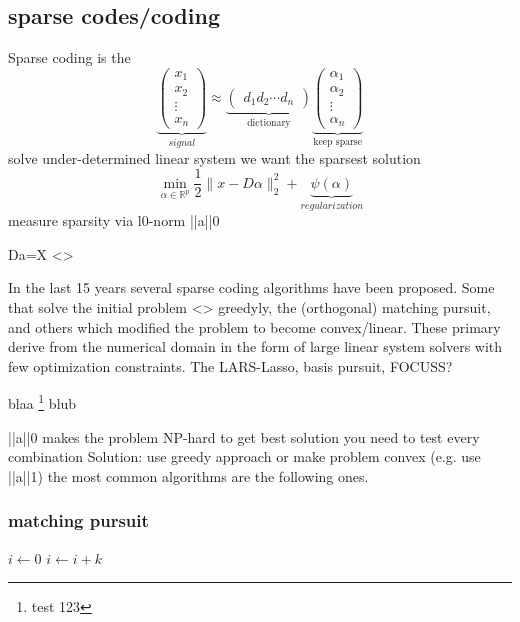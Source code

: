 \subsection{sparse codes/coding}
Sparse coding is the 
\[
\underbrace{\begin{pmatrix} x_1 \\ x_2 \\ \vdots \\ x_n \end{pmatrix}}_{signal} \approx \underbrace{\begin{pmatrix} d_1  d_2 \cdots d_n \end{pmatrix}}_{\textrm{dictionary}}
\underbrace{\begin{pmatrix} \alpha_1 \\ \alpha_2 \\ \vdots \\ \alpha_n \end{pmatrix}}_{\textrm{keep sparse}}
\]
solve under-determined linear system
we want the sparsest solution
\[
\min_{\alpha\in\mathbb{R}^{p}} \frac{1}{2} \lVert x - D\alpha \rVert^{2}_{2} + \underbrace{\psi(\alpha)}_{regularization}
\] 
measure sparsity via       l0-norm       ||a||0

Da=X
<>

In the last 15 years several sparse coding algorithms have been proposed. 
Some that solve the initial problem <> greedyly, the (orthogonal) matching pursuit, and others which modified the problem to become convex/linear. These primary derive from the numerical domain in the form of 
large linear system solvers with few optimization constraints. The LARS-Lasso, basis pursuit, FOCUSS?


blaa \footnote{test 123} blub

||a||0 makes the problem NP-hard
to get best solution you need to test every combination
Solution:
use greedy approach or make problem convex (e.g. use ||a||1)
the most common algorithms are the following ones.

\subsubsection{matching pursuit}
\begin{algorithmic}
        \STATE $i\gets 0$
\ELSE
                \STATE $i\gets i+k$
        \ENDIF
\ENDIF 
\end{algorithmic}

